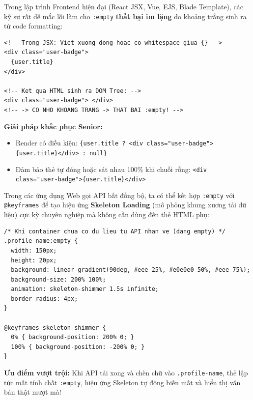 \documentclass[11pt,oneside]{book}
\newcommand{\codeinline}[1]{\textcolor{accentOrange}{\texttt{#1}}}
\begin{document}
\begin{conceptBox}
Trong lập trình Frontend hiện đại (React JSX, Vue, EJS, Blade Template), các kỹ sư rất dễ mắc lỗi làm cho \codeinline{:empty} \textbf{thất bại im lặng} do khoảng trắng sinh ra từ code formatting:
\begin{codeWindow}
\begin{lstlisting}[language=HTML5]
<!-- Trong JSX: Viet xuong dong hoac co whitespace giua {} -->
<div class="user-badge">
  {user.title} 
</div>

<!-- Ket qua HTML sinh ra DOM Tree: -->
<div class="user-badge"> </div> 
<!-- -> CO NHO KHOANG TRANG -> THAT BAI :empty! -->
\end{lstlisting}
\end{codeWindow}
\par\vspace{4pt}
\textbf{Giải pháp khắc phục Senior:} 
\begin{itemize}[leftmargin=1.5em, itemsep=2pt, parsep=0pt]
    \item Render có điều kiện: \codeinline{\{user.title ? <div class="user-badge">\{user.title\}</div> : null\}}
    \item Đảm bảo thẻ tự đóng hoặc sát nhau 100\% khi chuỗi rỗng: \codeinline{<div class="user-badge">\{user.title\}</div>}
\end{itemize}
\end{conceptBox}

\begin{tipBox}
Trong các ứng dụng Web gọi API bất đồng bộ, ta có thể kết hợp \codeinline{:empty} với \codeinline{@keyframes} để tạo hiệu ứng \textbf{Skeleton Loading} (mô phỏng khung xương tải dữ liệu) cực kỳ chuyên nghiệp mà không cần dùng đến thẻ HTML phụ:
\begin{codeWindow}
\begin{lstlisting}[language=CSS3]
/* Khi container chua co du lieu tu API nhan ve (dang empty) */
.profile-name:empty {
  width: 150px;
  height: 20px;
  background: linear-gradient(90deg, #eee 25%, #e0e0e0 50%, #eee 75%);
  background-size: 200% 100%;
  animation: skeleton-shimmer 1.5s infinite;
  border-radius: 4px;
}

@keyframes skeleton-shimmer {
  0% { background-position: 200% 0; }
  100% { background-position: -200% 0; }
}
\end{lstlisting}
\end{codeWindow}
\textbf{Ưu điểm vượt trội:} Khi API tải xong và chèn chữ vào \codeinline{.profile-name}, thẻ lập tức mất tính chất \codeinline{:empty}, hiệu ứng Skeleton tự động biến mất và hiển thị văn bản thật mượt mà!
\end{tipBox}
\end{document}
